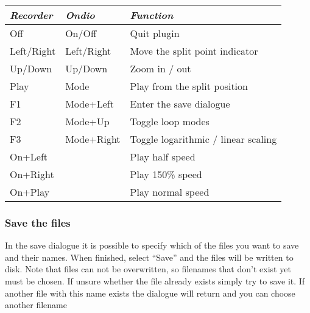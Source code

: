 \begin{tabular}[c]{|p{2.975cm}|p{3.047cm}|p{6.649cm}|}
\hline
{\centering\bfseries\itshape
Recorder 
\par}
&
{\centering\bfseries\itshape
Ondio 
\par}
&
{\centering\bfseries\itshape
Function 
\par}
\\\hline
{\centering
Off 
\par}
&
{\centering
On/Off 
\par}
&
Quit plugin 
\\\hline
{\centering
Left/Right 
\par}
&
{\centering
Left/Right 
\par}
&
Move the split point indicator 
\\\hline
{\centering
Up/Down 
\par}
&
{\centering
Up/Down 
\par}
&
Zoom in / out 
\\\hline
{\centering
Play 
\par}
&
{\centering
Mode 
\par}
&
Play from the split position 
\\\hline
{\centering
F1 
\par}
&
{\centering
Mode+Left 
\par}
&
Enter the save dialogue
\\\hline
{\centering
F2 
\par}
&
{\centering
Mode+Up 
\par}
&
Toggle loop modes 
\\\hline
{\centering
F3 
\par}
&
{\centering
Mode+Right 
\par}
&
Toggle logarithmic / linear scaling 
\\\hline
{\centering
On+Left 
\par}
&
{\centering
~ 
\par}
&
Play half speed 
\\\hline
{\centering
On+Right 
\par}
&
{\centering
~ 
\par}
&
Play 150\% speed 
\\\hline
{\centering
On+Play 
\par}
&
{\centering
~ 
\par}
&
Play normal speed 
\\\hline
\end{tabular}

\subsubsection{Save the files}
In the save dialogue it is possible to specify which of the files you
want to save and their names.  When finished, select
``Save'' and the files will be written to
disk. Note that files can not be overwritten, so filenames that
don't exist yet must be chosen. If unsure whether the
file already exists simply try to save it. If another file with this
name exists the dialogue will return and you can choose another
filename

